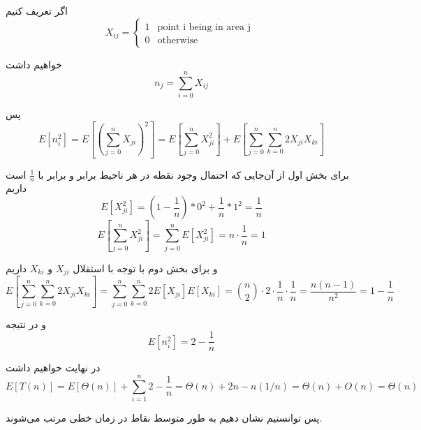 اگر تعریف کنیم
\begin{equation}
	X_{ij} = \begin{cases}
		1 & \mbox{
		point i being in area j
		} \\
		0 & \mbox{otherwise} 
	\end{cases}
\end{equation}

خواهیم داشت
\begin{equation}
	n_j = \sum_{i=0} ^n X_{ij} 
\end{equation}

پس
\begin{equation}
	E[n^2_i] = E[(\sum_{j=0} ^n X_{ji})^2] = E[\sum_{j=0} ^n X_{ji}^2] + E[\sum_{j=0} ^n \sum_{k=0} ^n 2 X_{ji} X_{ki}]
\end{equation}

برای بخش اول از آن‌جایی که احتمال وجود نقطه در هر ناحیط برابر و برابر با 
$\frac{1}{n}$
است داریم
\begin{equation}
	E[X^2_{ji}] = (1-\frac{1}{n}) * 0^2 + \frac{1}{n} * 1^2 = \frac{1}{n}
\end{equation}
\begin{equation}
	E[\sum_{j=0} ^n X_{ji}^2] = \sum_{j=0} ^n E[X_{ji}^2] = n \cdot \frac{1}{n} = 1
\end{equation}

و برای بخش دوم با توجه با استقلال
$X_{ji}$
و
$X_{ki}$
داریم
\begin{equation}
	E[\sum_{j=0} ^n \sum_{k=0} ^n 2 X_{ji} X_{ki}] = \sum_{j=0} ^n \sum_{k=0} ^n 2 E[X_{ji}] E[X_{ki}] = {n \choose 2} \cdot 2\cdot\frac{1}{n}\cdot \frac{1}{n} = \frac{n(n-1)}{n^2} = 1 - \frac{1}{n}
\end{equation}

و در نتیجه 
\begin{equation}
	E[n_i ^ 2] = 2 - \frac{1}{n}
\end{equation}

در نهایت خواهیم داشت
\begin{equation}
	E[T(n)] = E[\Theta(n)] + \sum_{i=1}^n 2 - \frac{1}{n} = 
	\Theta(n) + 2n - n(1/n) = \Theta(n) + O(n) = \Theta(n)
\end{equation}

پس توانستیم 
نشان دهیم به طور متوسط نقاط در زمان خطی مرتب می‌شوند.

\newpage